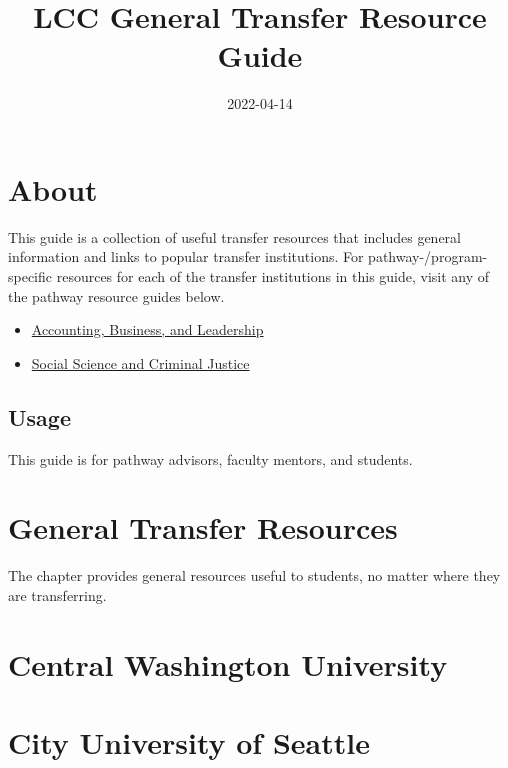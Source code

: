 \documentclass[
]{book}
\title{LCC General Transfer Resource Guide}
\author{}
\date{\vspace{-2.5em}2022-04-14}
\providecommand{\tightlist}{%
  \setlength{\itemsep}{0pt}\setlength{\parskip}{0pt}}
\begin{document}
\maketitle

{
\hypersetup{linkcolor=}
\setcounter{tocdepth}{1}
\tableofcontents
}
\hypertarget{about}{%
\chapter*{About}\label{about}}

This guide is a collection of useful transfer resources that includes general information and links to popular transfer institutions. For pathway-/program-specific resources for each of the transfer institutions in this guide, visit any of the pathway resource guides below.

\begin{itemize}
\tightlist
\item
  \href{https://bateyt.github.io/resourceguide_abl}{Accounting, Business, and Leadership}
\item
  \href{https://bateyt.github.io/resourceguide_sscj}{Social Science and Criminal Justice}
\end{itemize}

\hypertarget{usage}{%
\section*{Usage}\label{usage}}

This guide is for pathway advisors, faculty mentors, and students.

\hypertarget{general}{%
\chapter{General Transfer Resources}\label{general}}

The chapter provides general resources useful to students, no matter where they are transferring.

\hypertarget{central-washington-university}{%
\chapter{Central Washington University}\label{central-washington-university}}

\hypertarget{city-university-of-seattle}{%
\chapter{City University of Seattle}\label{city-university-of-seattle}}
\end{document}
